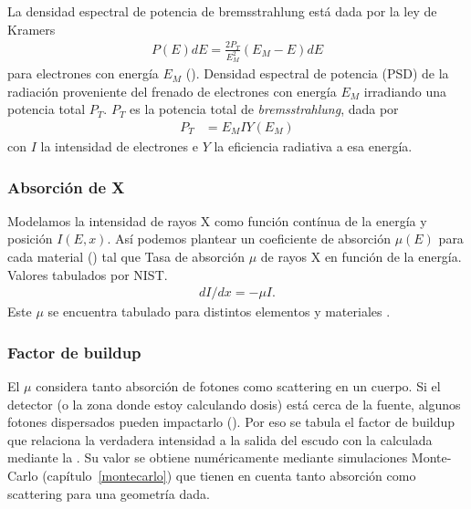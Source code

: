 La densidad espectral de potencia de bremsstrahlung está dada por la ley de
Kramers\cite{kramers_xciii._1923}
\begin{align}
    P(E)dE = \frac{2P_T}{E_M^2}(E_M-E)dE
    \label{eq:kramers}
\end{align} para electrones con energía $E_M$ ().
{Densidad espectral de potencia (PSD) de la radiación proveniente del 
frenado de electrones con energía $E_M$ irradiando una potencia total $P_T$.}
$P_T$ es la potencia total de \emph{bremsstrahlung}, dada por
\begin{align*}
    P_T&=E_MIY(E_M)
\end{align*}con $I$ la intensidad de electrones e $Y$ la eficiencia radiativa a
esa energía.
\subsubsection{Absorción de X}
Modelamos la intensidad de rayos X como función contínua de la energía y
posición $I(E,x)$.
Así podemos plantear un coeficiente de absorción $\mu(E)$ para cada 
material () tal que 
{Tasa de absorción $\mu$ de rayos X en función de la energía.
    Valores tabulados por NIST\cite{xraycoef}.}
\begin{align}
    \label{eq:absorcionx}
    dI/dx=-\mu I.
\end{align}
Este $\mu$ se encuentra tabulado para distintos elementos y materiales
\cite{xraycoef}.
\subsubsection{Factor de buildup}
El $\mu$ considera tanto absorción de fotones como scattering en un cuerpo.
Si el detector (o la zona donde estoy calculando dosis) 
está cerca de la fuente, 
algunos fotones dispersados pueden impactarlo ().
Por eso se tabula el factor de buildup
que relaciona la verdadera intensidad a la salida del escudo 
con la calculada mediante la .
Su valor se obtiene numéricamente mediante simulaciones Monte-Carlo
(capítulo~\ref{montecarlo})
que tienen en cuenta tanto absorción como scattering
para una geometría dada.
